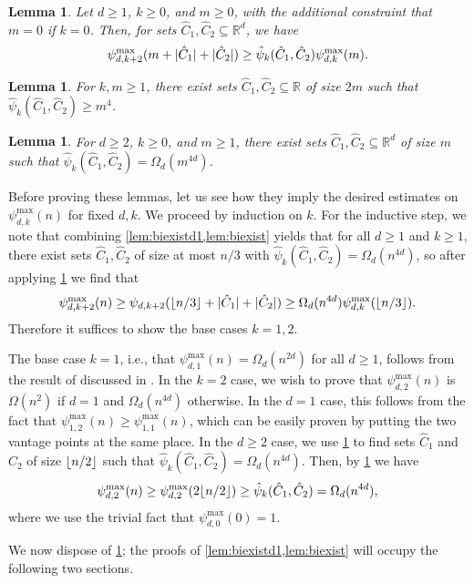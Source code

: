\documentclass[11pt]{amsart}
\newtheorem{lemma}[theorem]{Lemma}
\theoremstyle{definition}
\DeclarePairedDelimiter{\abs}{\lvert}{\rvert}
\DeclarePairedDelimiter{\floor}{\lfloor}{\rfloor}
\newcommand{\perm}{\psi^{\mathrm{max}}}
\newcommand{\RR}{\mathbb{R}}
\begin{document}
\begin{lemma} \label{lem:lowerinduction}
Let $d \geq 1$, $k\geq 0$, and $m \geq 0$, with the additional constraint that $m=0$ if $k=0$. Then, for sets $\hat C_1, \hat C_2 \subseteq \RR^d$, we have
\[\perm_{d,k+2}(m + \abs{\hat C_1} + \abs{\hat C_2}) \geq \hat \psi_k(\hat C_1, \hat C_2) \perm_{d,k}(m).\]
\end{lemma}
\begin{lemma} \label{lem:biexistd1}
For $k,m \geq 1$, there exist sets $\hat C_1, \hat C_2 \subseteq \RR$ of size $2m$ such that ${\hat \psi_k(\hat C_1, \hat C_2) \geq m^4}$.
\end{lemma}
\begin{lemma} \label{lem:biexist}
For $d \geq 2$, $k \geq 0$, and $m \geq 1$, there exist sets $\hat C_1, \hat C_2 \subseteq \RR^d$ of size $m$ such that $\hat \psi_k(\hat C_1, \hat C_2) = \Omega_{d}(m^{4d})$.
\end{lemma}

Before proving these lemmas, let us see how they imply the desired estimates on $\perm_{d,k}(n)$ for fixed $d,k$.  We proceed by induction on $k$. For the inductive step, we note that combining \cref{lem:biexistd1,lem:biexist} yields that for all $d \geq 1$ and $k \geq 1$, there exist sets $\hat C_1, \hat C_2$ of size at most $n/3$ with $\hat \psi_k(\hat C_1, \hat C_2) = \Omega_{d}(n^{4d})$, so after applying \cref{lem:lowerinduction} we find that
\[\perm_{d,k+2}(n) \geq \psi_{d,k+2}(\floor{n/3} + \abs{\hat C_1} + \abs{\hat C_2}) \geq \Omega_{d}(n^{4d}) \perm_{d,k}(\floor{n/3}).\]
Therefore it suffices to show the base cases $k = 1,2$.

The base case $k = 1$, i.e., that $\perm_{d,1}(n) = \Omega_d(n^{2d})$ for all $d \geq 1$, follows from the result of \cite{Good1977, Zaslavsky2002} discussed in . In the $k = 2$ case, we wish to prove that $\perm_{d,2}(n)$ is $\Omega(n^2)$ if $d = 1$ and $\Omega_d(n^{4d})$ otherwise. In the $d = 1$ case, this follows from the fact that $\perm_{1,2}(n) \geq \perm_{1,1}(n)$, which can be easily proven by putting the two vantage points at the same place. In the $d \geq 2$ case, we use \cref{lem:biexist} to find sets $\hat C_1$ and $\hat C_2$ of size $\floor{n/2}$ such that $\hat \psi_k(\hat C_1,\hat C_2) = \Omega_d(n^{4d})$. Then, by \cref{lem:lowerinduction} we have
\[\perm_{d,2}(n) \geq \perm_{d,2}(2\floor{n/2}) \geq \hat \psi_k(\hat C_1,\hat C_2) = \Omega_d(n^{4d}),\]
where we use the trivial fact that $\perm_{d,0}(0) = 1$.

We now dispose of \cref{lem:lowerinduction}; the proofs of \cref{lem:biexistd1,lem:biexist} will occupy the following two sections.
\end{document}
